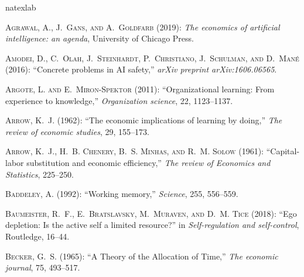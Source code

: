 \documentclass[11pt]{article}
\theoremstyle{definition}
\theoremstyle{remark}
\begin{document}
\newpage
\begin{thebibliography}{70}
\newcommand{\enquote}[1]{``#1''}
\expandafter\ifx\csname natexlab\endcsname\relax\def\natexlab#1{#1}\fi

\textsc{Agrawal, A., J.~Gans, and A.~Goldfarb} (2019): \emph{The economics of artificial intelligence: an agenda}, University of Chicago Press.

\textsc{Amodei, D., C.~Olah, J.~Steinhardt, P.~Christiano, J.~Schulman, and D.~Man{\'e}} (2016): \enquote{Concrete problems in AI safety,} \emph{arXiv preprint arXiv:1606.06565}.

\textsc{Argote, L. and E.~Miron-Spektor} (2011): \enquote{Organizational learning: From experience to knowledge,} \emph{Organization science}, 22, 1123--1137.

\textsc{Arrow, K.~J.} (1962): \enquote{The economic implications of learning by doing,} \emph{The review of economic studies}, 29, 155--173.

\textsc{Arrow, K.~J., H.~B. Chenery, B.~S. Minhas, and R.~M. Solow} (1961): \enquote{Capital-labor substitution and economic efficiency,} \emph{The review of Economics and Statistics}, 225--250.

\textsc{Baddeley, A.} (1992): \enquote{Working memory,} \emph{Science}, 255, 556--559.

\textsc{Baumeister, R.~F., E.~Bratslavsky, M.~Muraven, and D.~M. Tice} (2018): \enquote{Ego depletion: Is the active self a limited resource?} in \emph{Self-regulation and self-control}, Routledge, 16--44.

\textsc{Becker, G.~S.} (1965): \enquote{A Theory of the Allocation of Time,} \emph{The economic journal}, 75, 493--517.


\end{thebibliography}
\end{document}
